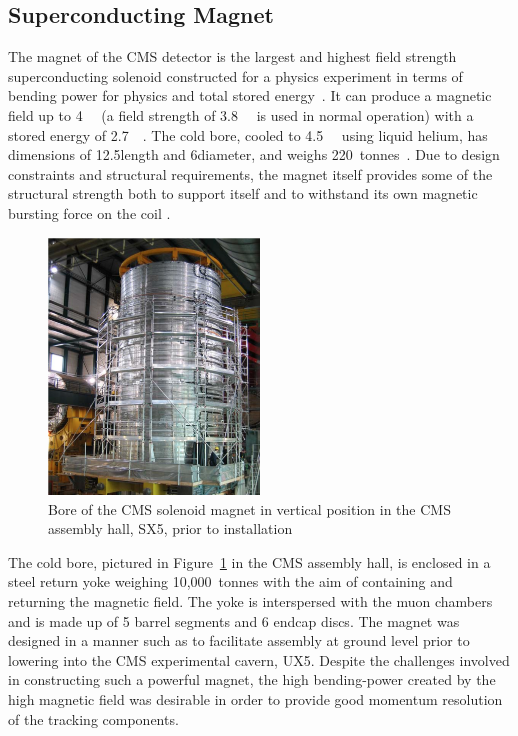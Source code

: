 \subsection{Superconducting Magnet}
\label{ss:Magnet}
The magnet of the CMS detector is the largest and highest field strength superconducting solenoid constructed
for a physics experiment in terms of bending power for physics and total stored energy~\cite{CMS_experiment}.
It can produce a magnetic field up to 4~\tesla~ (a field strength of 3.8~\tesla~ is used in normal operation)
with a stored energy of 2.7~\giga\joule~\cite{CMS_TDR1}. The cold bore, cooled to 4.5~\kelvin~ using liquid
helium, has dimensions of 12.5\m length and 6\m diameter, and weighs
220~tonnes~\cite{Cryogenic_System_for_Superconducting_Solenoid}.
Due to design constraints and structural requirements, the magnet itself provides some of the structural
strength both to support itself and to withstand its own magnetic bursting force on the coil
\cite{CMS_experiment}.

\begin{figure}[hbtp]
   \centering
     \includegraphics[width=0.5\textwidth]{Chapters/02_Detector/Images/Cold_mass.png}\hfill
     \caption[Bore of the CMS solenoid magnet in vertical position in the CMS assembly hall, SX5.]{Bore of the
     CMS solenoid magnet in vertical position in the CMS assembly hall, SX5, prior to installation \cite{CMS_experiment}}
     \label{fig:CMS_magnet_cold_bore}
\end{figure}
 
The cold bore, pictured in Figure~\ref{fig:CMS_magnet_cold_bore} in the CMS assembly hall, is enclosed in a
steel return yoke weighing 10,000~tonnes with the aim of containing and returning the magnetic field. The yoke
is interspersed with the muon chambers and is made up of 5 barrel segments and 6 endcap discs. The magnet was
designed in a manner such as to facilitate assembly at ground level prior to lowering into the CMS
experimental cavern, UX5. Despite the challenges involved in constructing such a powerful magnet, the high
bending-power created by the high magnetic field was desirable in order to provide good momentum
resolution of the tracking components.

